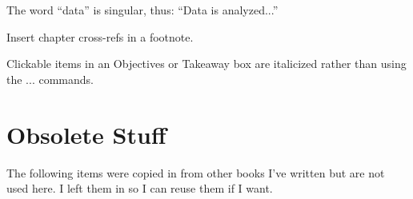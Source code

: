 \begin{enumerate}[resume]
The word ``data'' is singular, thus: ``Data is analyzed...''

Insert chapter cross-refs in a footnote.

Clickable items in an Objectives or Takeaway box are italicized rather than using the \fmt... commands.


\section{Obsolete Stuff}
The following items were copied in from other books I've written but are not used here. I left them in so I can reuse them if I want.





\end{enumerate}
